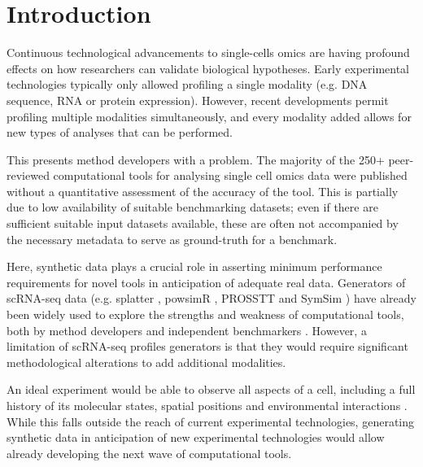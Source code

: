 

\section{Introduction}
Continuous technological advancements to single-cells omics are having profound 
effects on how researchers can validate biological hypotheses. 
Early experimental technologies typically only allowed profiling a single modality (e.g. DNA sequence, 
RNA or protein expression). However, recent developments permit profiling multiple modalities simultaneously,
and every modality added allows for new types of analyses that can be performed.

This presents method developers with a problem. The majority of the 250+ peer-reviewed computational tools for analysing single cell omics data were published without a quantitative assessment of the accuracy of the tool. This is partially due to low availability of suitable benchmarking datasets; even if there are sufficient suitable input datasets available, these are often not accompanied by the necessary metadata to serve as ground-truth for a benchmark.

Here, synthetic data plays a crucial role in asserting minimum performance requirements for novel tools in anticipation of adequate real data. Generators of scRNA-seq data (e.g. splatter \cite{zappia_splattersimulationsinglecell_2017}, powsimR \cite{vieth_powsimrpoweranalysis_2017}, PROSSTT \cite{papadopoulos_prossttprobabilisticsimulation_2018} and SymSim \cite{zhang_simulatingmultiplefaceted_2019}) have already been widely used to explore the strengths and weakness of computational tools, both by method developers \cite{street_slingshotcelllineage_2018,parra_reconstructingcomplexlineage_2018,lummertzdarocha_reconstructioncomplexsinglecell_2018,lin_scclassifyhierarchicalclassification_2019} and independent benchmarkers \cite{duo_systematicperformanceevaluation_2018,saelens_comparisonsinglecelltrajectory_2019,soneson_biasrobustnessscalability_2018}.
However, a limitation of scRNA-seq profiles generators is that they would require significant methodological alterations to add additional modalities.

An ideal experiment would be able to observe all aspects of a cell, including a full history of its 
molecular states, spatial positions and environmental interactions \cite{stuart_integrativesinglecellanalysis_2019}.
While this falls outside the reach of current experimental technologies, generating synthetic data in anticipation of new experimental technologies would allow already developing the next wave of computational tools.

